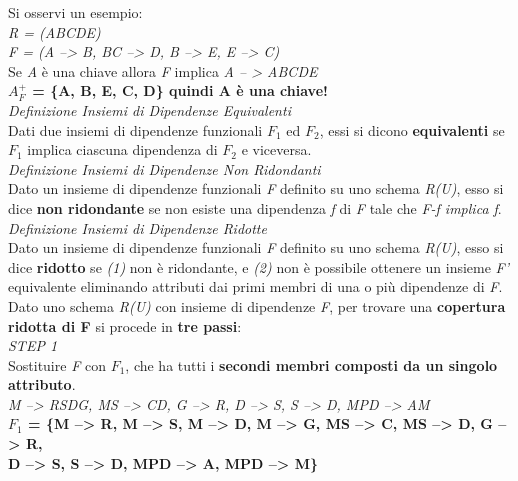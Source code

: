 \documentclass{article}
\begin{document}
Si osservi un esempio:\\
\textit{R = (ABCDE)}\\
\textit{F = (A --> B, BC --> D, B --> E, E --> C)}\\
Se \textit{A} è una chiave allora \textit{F} implica \textit{A -- > ABCDE}\\
\textbf{$A^+_F$ = \{A, B, E, C, D\} quindi A è una chiave!}\vspace{14pt}\\
\textit{Definizione Insiemi di Dipendenze Equivalenti}\\
Dati due insiemi di dipendenze funzionali \textit{$F_1$} ed \textit{$F_2$}, essi si dicono \textbf{equivalenti} se \textit{$F_1$} implica ciascuna dipendenza di \textit{$F_2$} e viceversa.\vspace{14pt}\\
\textit{Definizione Insiemi di Dipendenze Non Ridondanti}\\
Dato un insieme di dipendenze funzionali \textit{F} definito su uno schema \textit{R(U)}, esso si dice \textbf{non ridondante} se non esiste una dipendenza \textit{f} di \textit{F} tale che \textit{F-{f} implica f}.\vspace{14pt}\\
\textit{Definizione Insiemi di Dipendenze Ridotte}\\
Dato un insieme di dipendenze funzionali \textit{F} definito su uno schema \textit{R(U)}, esso si dice \textbf{ridotto} se \textit{(1)} non è ridondante, e \textit{(2)} non è possibile ottenere un insieme \textit{F’} equivalente eliminando attributi dai primi membri di una o più dipendenze di \textit{F}.\vspace{14pt}\\
Dato uno schema \textit{R(U)} con insieme di dipendenze \textit{F}, per trovare una \textbf{copertura ridotta di F} si procede in \textbf{tre passi}:\vspace{14pt}\\
\textit{STEP 1}\\
Sostituire \textit{F} con \textit{$F_1$}, che ha tutti i \textbf{secondi membri composti da un singolo attributo}.\vspace{14pt}\\
\textit{M --> RSDG, MS --> CD, G --> R, D --> S, S --> D, MPD --> AM}\\
\textbf{$F_1$ = \{M --> R, M --> S, M --> D, M --> G, MS --> C, MS --> D, G --> R, \\D --> S, S --> D, MPD --> A, MPD --> M\}}\vspace{14pt}\\
\end{document}
